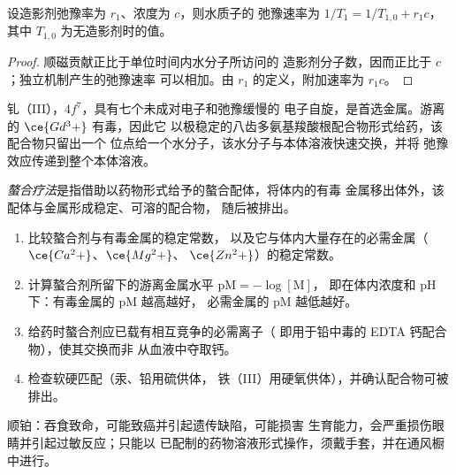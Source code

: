 \begin{proposition}[弛豫速率]\label{prop:b3:bioinorganic:relaxivity}
设造影剂弛豫率为 $r_1$、浓度为 $c$，则水质子的
弛豫速率为 $1/T_1 = 1/T_{1,0} + r_1c$，其中 $T_{1,0}$ 为无造影剂时的值。
\end{proposition}

\begin{proof}
顺磁贡献正比于单位时间内水分子所访问的
造影剂分子数，因而正比于 $c$；独立机制产生的弛豫速率
可以相加。由 $r_1$ 的定义，附加速率为 $r_1c$。
\end{proof}

钆（III），$4f^7$，具有七个未成对电子和弛豫缓慢的
电子自旋，是首选金属。游离的 $\ce{Gd^3+}$ 有毒，因此它
以极稳定的八齿多氨基羧酸根配合物形式给药，该配合物只留出一个
位点给一个水分子，该水分子与本体溶液快速交换，并将
弛豫效应传递到整个本体溶液。

\begin{definition}[螯合疗法]\label{def:b3:bioinorganic:chelation-therapy}
\emph{螯合疗法}是指借助以药物形式给予的螯合配体，将体内的有毒
金属移出体外，该配体与金属形成稳定、可溶的配合物，
随后被排出。
\end{definition}

\begin{method}[选择螯合药物]\label{met:b3:bioinorganic:choose-chelator}
\begin{enumerate}
  \item 比较螯合剂与有毒金属的稳定常数，
        以及它与体内大量存在的必需金属（$\ce{Ca^2+}$、$\ce{Mg^2+}$、
        $\ce{Zn^2+}$）的稳定常数。
  \item 计算螯合剂所留下的游离金属水平 $\mathrm{pM} = -\log[\mathrm M]$，
        即在体内浓度和 pH 下：有毒金属的 pM 越高越好，
        必需金属的 pM 越低越好。
  \item 给药时螯合剂应已载有相互竞争的必需离子（
        即用于铅中毒的 EDTA 钙配合物），使其交换而非
        从血液中夺取钙。
  \item 检查软硬匹配（汞、铅用硫供体，
        铁（III）用硬氧供体），并确认配合物可被排出。
\end{enumerate}
\end{method}

\begin{safety}{}
顺铂：吞食致命，可能致癌并引起遗传缺陷，可能损害
生育能力，会严重损伤眼睛并引起过敏反应；只能以
已配制的药物溶液形式操作，须戴手套，并在通风橱中进行。
\end{safety}

